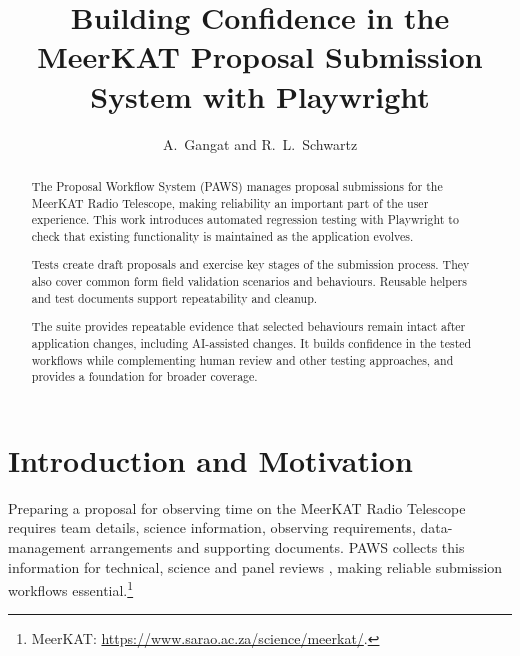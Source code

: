\documentclass[11pt,twoside]{article}
\begin{document}
\title{Building Confidence in the MeerKAT Proposal Submission System with Playwright}
\author{A.~Gangat and R.~L.~Schwartz}




\begin{abstract}
The Proposal Workflow System (PAWS) manages proposal submissions for the MeerKAT Radio Telescope, making reliability an important part of the user experience. This work introduces automated regression testing with Playwright to check that existing functionality is maintained as the application evolves.

Tests create draft proposals and exercise key stages of the submission process. They also cover common form field validation scenarios and behaviours. Reusable helpers and test documents support repeatability and cleanup.

The suite provides repeatable evidence that selected behaviours remain intact after application changes, including AI-assisted changes. It builds confidence in the tested workflows while complementing human review and other testing approaches, and provides a foundation for broader coverage.
\end{abstract}

\section{Introduction and Motivation}

Preparing a proposal for observing time on the MeerKAT Radio Telescope requires team details, science information, observing requirements, data-management arrangements and supporting documents. PAWS collects this information for technical, science and panel reviews \citep{SchwartzBaloyiSithole2024PAWSSubmission,SchwartzBaloyi2024PAWSReview}, making reliable submission workflows essential.\footnote{MeerKAT: \url{https://www.sarao.ac.za/science/meerkat/}.}
\end{document}
